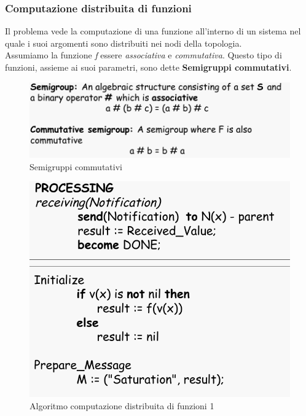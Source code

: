 \documentclass[12pt]{article}
\begin{document}
		\subsubsection{Computazione distribuita di funzioni}
			Il problema vede la computazione di una funzione all'interno di un sistema nel quale i suoi argomenti sono distribuiti nei nodi della topologia. \\
			Assumiamo la funzione \textit{f} essere \textit{associativa } e \textit{commutativa}. Questo tipo di funzioni, assieme ai suoi parametri, sono dette \textbf{Semigruppi commutativi}. 
			\begin{figure}[h!]
				\centering
				\includegraphics[scale=0.3]{img/semigrup.png}
				\caption{Semigruppi commutativi}
			\end{figure}
			\begin{figure}[h!]
				\centering
				\includegraphics[scale=0.3]{img/distfun.png}
				\caption{Algoritmo computazione distribuita di funzioni 1}
			\end{figure}	
\end{document}
